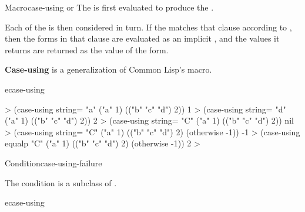 \documentclass[10pt,twoside,english,pdftex]{article}
\begin{document}
\begin{functiondoc}{Macro}{case-using}{%
     or \nil}
The  is first evaluated to produce the .

Each of the  is then considered in turn. If the
 matches that clause according to , then the
forms in that clause are evaluated as an implicit , and the
values it returns are returned as the value of the 
form.

\textbf{Case-using} is a generalization of Common Lisp's  macro.

\begin{alsos}{ecase-using}
\end{alsos}

\fnexamples
%
\W\supp
\begin{example}
  > (case-using string= "a"
      ("a" 1)
      (("b" "c" "d") 2))
  1
  > (case-using string= "d"
      ("a" 1)
      (("b" "c" "d") 2))
  2\goodpagebreak
  > (case-using string= "C"
      ("a" 1)
      (("b" "c" "d") 2))
  nil\goodpagebreak
  > (case-using string= "C"
      ("a" 1)
      (("b" "c" "d") 2)
      (otherwise -1))
  -1
  > (case-using equalp "C"
      ("a" 1)
      (("b" "c" "d") 2)
      (otherwise -1))
  2
  >
\end{example}

\end{functiondoc}


\begin{functiondoc}{Condition}{case-using-failure}{}
%
  
\fnsyntax

\fnpackage {}

\fnmodule {}

%
%
\fndescription
%
The condition  is a subclass of
.

\begin{alsos}{ecase-using}
\end{alsos}

\end{functiondoc}

\end{document}
